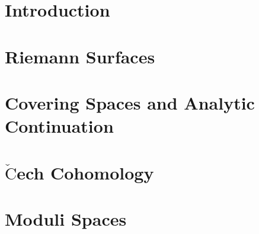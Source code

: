 \documentclass[a4paper, 8pt, notitlepage]{extreport}
\begin{document}
    

    \chapter{Introduction}\label{cpt:introduction}
    
    

    \chapter{Riemann Surfaces}\label{cpt:Riemann_surfaces}
    
    

    \chapter{Covering Spaces and Analytic Continuation}\label{cpt:covering_spaces_analytic_continuation}
    
    
    

    \chapter{$\check{\textrm{C}}$ech Cohomology}\label{cpt:sheaf_cohomology}
    
    
    

    \chapter{Moduli Spaces}\label{ctp:moduli_spaces}
    
    

    
\end{document}
